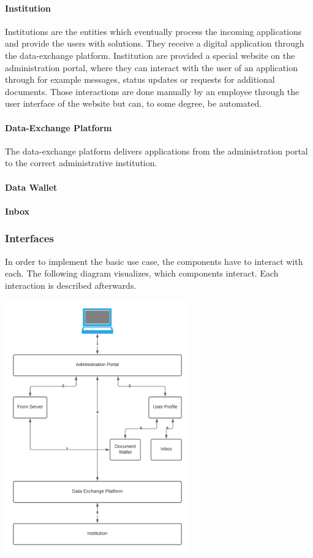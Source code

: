 \documentclass[
     12pt,         %
     a4paper,      %
     BCOR=10mm,version=first,     %
     DIV=14,version=first,        %
     ]{scrreprt}
\begin{document}
\paragraph{Institution}
Institutions are the entities which eventually process the incoming applications and provide the users with solutions. They receive a digital application through the data-exchange platform. Institution are provided a special website on the administration portal, where they can interact with the user of an application through for example messages, status updates or requests for additional documents. Those interactions are done manually by an employee through the user interface of the website but can, to some degree, be automated.

\paragraph{Data-Exchange Platform}
The data-exchange platform delivers applications from the administration portal to the correct administrative institution.

\paragraph{Data Wallet}

\paragraph{Inbox}

\subsubsection{Interfaces}
In order to implement the basic use case, the components have to interact with each. The following diagram visualizes, which components interact. Each interaction is described afterwards.

\begin{center}
    \includegraphics[width=8cm]{Interaction Diagram.png}
\end{center}
\end{document}
